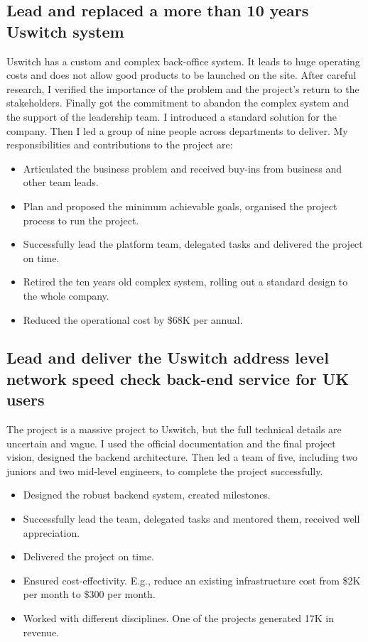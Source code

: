 \documentclass[a4paper]{twentysecondcv-english} %
\begin{document}
\newpage %
\makesidebar
\subsection{Lead and replaced a more than 10 years Uswitch system}
Uswitch has a custom and complex back-office system. It leads to huge operating costs and does not allow good products to be launched on the site. After careful research, I verified the importance of the problem and the project's return to the stakeholders. Finally got the commitment to abandon the complex system and the support of the leadership team. I introduced a standard solution for the company. Then I led a group of nine people across departments to deliver. My responsibilities and contributions to the project are:
\begin{itemize}
    \item Articulated the business problem and received buy-ins from business and other team leads.
    \item Plan and proposed the minimum achievable goals, organised the project process to run the project.
    \item Successfully lead the platform team, delegated tasks and delivered the project on time.
    \item Retired the ten years old complex system, rolling out a standard design to the whole company.
    \item Reduced the operational cost by \$68K per annual.
\end{itemize}

\subsection{Lead and deliver the Uswitch address level network speed check back-end service for UK users}
The project is a massive project to Uswitch, but the full technical details are uncertain and vague. I used the official documentation and the final project vision, designed the backend architecture. Then led a team of five, including two juniors and two mid-level engineers, to complete the project successfully.
\begin{itemize}
    \item Designed the robust backend system, created milestones.
    \item Successfully lead the team, delegated tasks and mentored them, received well appreciation.
    \item Delivered the project on time.
    \item Ensured cost-effectivity. E.g., reduce an existing infrastructure cost from \$2K per month to \$300 per month.
    \item Worked with different disciplines. One of the projects generated \textsterling17K in revenue.
\end{itemize}
\end{document}
